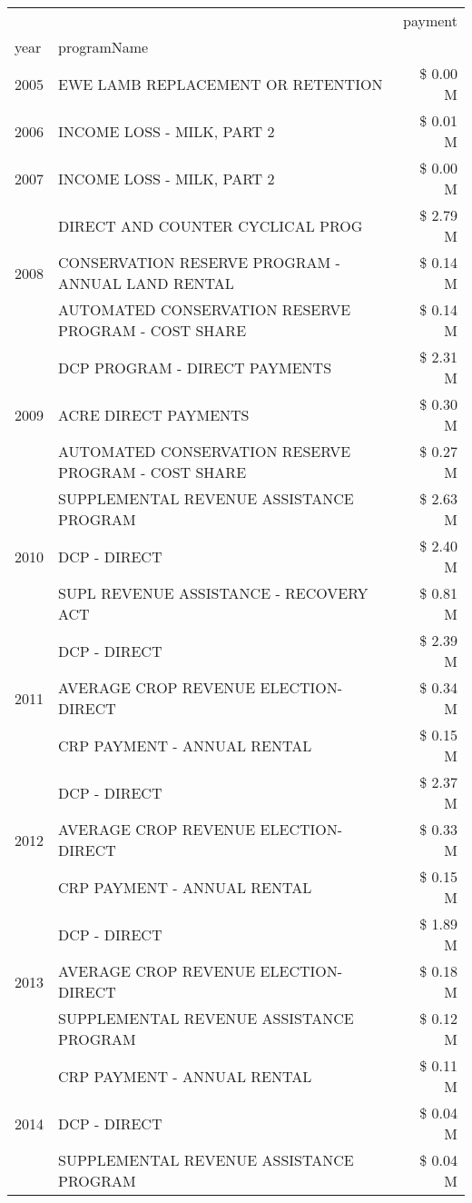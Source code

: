 \begin{tabular}{llr}
\toprule
 &  & payment \\
year & programName &  \\
\midrule
2005 & EWE LAMB REPLACEMENT OR RETENTION & \$ 0.00 M \\
\cline{1-3}
2006 & INCOME LOSS - MILK, PART 2 & \$ 0.01 M \\
\cline{1-3}
2007 & INCOME LOSS - MILK, PART 2 & \$ 0.00 M \\
\cline{1-3}
\multirow[t]{3}{*}{2008} & DIRECT AND COUNTER CYCLICAL PROG & \$ 2.79 M \\
 & CONSERVATION RESERVE PROGRAM - ANNUAL LAND RENTAL & \$ 0.14 M \\
 & AUTOMATED CONSERVATION RESERVE PROGRAM - COST SHARE & \$ 0.14 M \\
\cline{1-3}
\multirow[t]{3}{*}{2009} & DCP PROGRAM - DIRECT PAYMENTS & \$ 2.31 M \\
 & ACRE DIRECT PAYMENTS & \$ 0.30 M \\
 & AUTOMATED CONSERVATION RESERVE PROGRAM - COST SHARE & \$ 0.27 M \\
\cline{1-3}
\multirow[t]{3}{*}{2010} & SUPPLEMENTAL REVENUE ASSISTANCE PROGRAM & \$ 2.63 M \\
 & DCP - DIRECT & \$ 2.40 M \\
 & SUPL REVENUE ASSISTANCE - RECOVERY ACT & \$ 0.81 M \\
\cline{1-3}
\multirow[t]{3}{*}{2011} & DCP - DIRECT & \$ 2.39 M \\
 & AVERAGE CROP REVENUE ELECTION-DIRECT & \$ 0.34 M \\
 & CRP PAYMENT - ANNUAL RENTAL & \$ 0.15 M \\
\cline{1-3}
\multirow[t]{3}{*}{2012} & DCP - DIRECT & \$ 2.37 M \\
 & AVERAGE CROP REVENUE ELECTION-DIRECT & \$ 0.33 M \\
 & CRP PAYMENT - ANNUAL RENTAL & \$ 0.15 M \\
\cline{1-3}
\multirow[t]{3}{*}{2013} & DCP - DIRECT & \$ 1.89 M \\
 & AVERAGE CROP REVENUE ELECTION-DIRECT & \$ 0.18 M \\
 & SUPPLEMENTAL REVENUE ASSISTANCE PROGRAM & \$ 0.12 M \\
\cline{1-3}
\multirow[t]{3}{*}{2014} & CRP PAYMENT - ANNUAL RENTAL & \$ 0.11 M \\
 & DCP - DIRECT & \$ 0.04 M \\
 & SUPPLEMENTAL REVENUE ASSISTANCE PROGRAM & \$ 0.04 M \\

\end{tabular}
